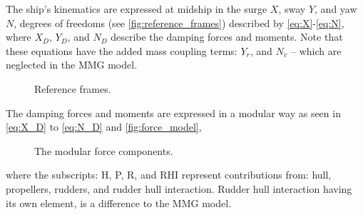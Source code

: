 The ship's kinematics are expressed at midship 
in the surge $X$, sway $Y$, and yaw $N$, degrees of freedoms (see \autoref{fig:reference_frames}) described by \autoref{eq:X}-\autoref{eq:N}, where $X_D$, $Y_D$, and $N_D$ describe the damping forces and moments. Note that these equations have the added mass coupling terms: $Y_{\dot{r}}$, and $N_{\dot{v}}$ -- which are neglected in the MMG model.
%
\begin{figure}[h]
    \centering
    
    \caption{Reference frames.}
    \label{fig:reference_frames}
\end{figure}
%
\begin{equation}
    \label{eq:X}
    
\end{equation}
%
\begin{equation}
    \label{eq:Y}
    
\end{equation}
%
\begin{equation}
    \label{eq:N}
    
\end{equation}
The damping forces and moments are expressed in a modular way as seen in \autoref{eq:X_D} to \autoref{eq:N_D} and \autoref{fig:force_model},
\begin{equation}
    \label{eq:X_D}
    
\end{equation}
%
\begin{equation}
    \label{eq:Y_D}
    
\end{equation}
%
\begin{equation}
    \label{eq:N_D}
    
\end{equation}
%
\begin{figure}[h]
    \centering
    
    \caption{The modular force components.}
    \label{fig:force_model}
\end{figure}
where the subscripts: H, P, R, and RHI represent contributions from: hull, propellers, rudders, and rudder hull interaction. Rudder hull interaction having its own element, is a difference to the MMG model.

